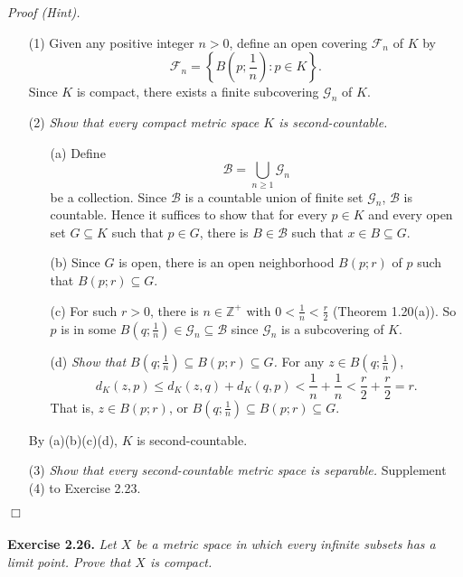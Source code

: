 \documentclass{article}
\begin{document}
\emph{Proof (Hint).}
\begin{enumerate}
\item[(1)]
Given any positive integer $n > 0$,
define an open covering $\mathscr{F}_n$ of $K$ by
$$\mathscr{F}_n = \left\{ B\left(p;\frac{1}{n}\right) : p \in K \right\}.$$
Since $K$ is compact,
there exists a finite subcovering $\mathscr{G}_n$ of $K$.
\item[(2)]
\emph{Show that every compact metric space $K$ is second-countable.}
  \begin{enumerate}
  \item[(a)]
  Define $$\mathscr{B} = \bigcup_{n \geq 1} \mathscr{G}_n$$ be a collection.
  Since $\mathscr{B}$ is a countable union of finite set $\mathscr{G}_n$,
  $\mathscr{B}$ is countable.
  Hence it suffices to show that
  for every $p \in K$ and every open set $G \subseteq K$ such that $p \in G$,
  there is $B \in \mathscr{B}$ such that $x \in B \subseteq G$.
  \item[(b)]
  Since $G$ is open,
  there is an open neighborhood $B(p;r)$ of $p$ such that $B(p;r) \subseteq G$.
  \item[(c)]
  For such $r > 0$, there is $n \in \mathbb{Z}^+$
  with $0 < \frac{1}{n} < \frac{r}{2}$ (Theorem 1.20(a)).
  So $p$ is in some $B\left(q;\frac{1}{n}\right) \in \mathscr{G}_n \subseteq \mathscr{B}$
  since $\mathscr{G}_n$ is a subcovering of $K$.
  \item[(d)]
  \emph{Show that $B\left(q;\frac{1}{n}\right) \subseteq B(p;r) \subseteq G$.}
  For any $z \in B(q;\frac{1}{n})$,
  $$d_K(z,p) \leq d_K(z,q)+ d_K(q,p) < \frac{1}{n} + \frac{1}{n}
  < \frac{r}{2} + \frac{r}{2} = r.$$
  That is, $z \in B(p;r)$, or $B\left(q;\frac{1}{n}\right) \subseteq B(p;r) \subseteq G$.
  \end{enumerate}
  By (a)(b)(c)(d), $K$ is second-countable.
\item[(3)]
\emph{Show that every second-countable metric space is separable.}
Supplement (4) to Exercise 2.23.
\end{enumerate}
$\Box$ \\\\






\textbf{Exercise 2.26.}
\emph{Let $X$ be a metric space in which every infinite subsets has a limit point.
Prove that $X$ is compact.} \\
\end{document}
